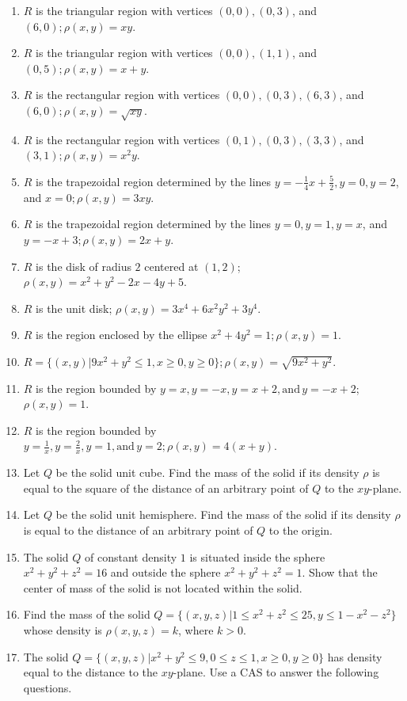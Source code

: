 \documentclass{exercises}
\begin{document}
\begin{enumerate}[resume]
\item $R$ is the triangular region with vertices $(0,0),(0,3)$, and $(6,0);\rho(x,y)=xy$.
\item $R$ is the triangular region with vertices $(0,0),(1,1)$, and $(0,5);\rho(x,y)=x+y$.
\item $R$ is the rectangular region with vertices $(0,0),(0,3),(6,3)$, and $(6,0);\rho(x,y)=\sqrt{xy}$.
\item $R$ is the rectangular region with vertices $(0,1),(0,3),(3,3)$, and $(3,1);\rho(x,y)=x^{2}y$.
\item $R$ is the trapezoidal region determined by the lines $y=-\frac{1}{4}x+\frac{5}{2},y=0,y=2$, and $x=0;\rho(x,y)=3xy$.
\item $R$ is the trapezoidal region determined by the lines $y=0,y=1,y=x$, and $y=-x+3;\rho(x,y)=2x+y$.
\item $R$ is the disk of radius $2$ centered at $(1,2)$; $\rho(x,y)=x^{2}+y^{2}-2x-4y+5$.
\item $R$ is the unit disk; $\rho(x,y)=3x^{4}+6x^{2}y^{2}+3y^{4}$.
\item $R$ is the region enclosed by the ellipse $x^{2}+4y^{2}=1;\rho(x,y)=1$.
\item $R=\{(x,y)|9x^{2}+y^{2}\le1,x\ge0,y\ge0\};\rho(x,y)=\sqrt{9x^{2}+y^{2}}$.
\item $R$ is the region bounded by $y=x,y=-x,y=x+2,\text{and}\,y=-x+2$; $\rho(x,y)=1$.
\item $R$ is the region bounded by $y=\frac{1}{x},y=\frac{2}{x},y=1,\text{and}\,y=2;\rho(x,y)=4(x+y)$.
\item Let $Q$ be the solid unit cube. Find the mass of the solid if its density $\rho$ is equal to the square of the distance of an arbitrary point of $Q$ to the $xy\text{-plane}$.
\item Let $Q$ be the solid unit hemisphere. Find the mass of the solid if its density $\rho$ is equal to the distance of an arbitrary point of $Q$ to the origin.
\item The solid $Q$ of constant density $1$ is situated inside the sphere $x^{2}+y^{2}+z^{2}=16$ and outside the sphere $x^{2}+y^{2}+z^{2}=1$. Show that the center of mass of the solid is not located within the solid.
\item Find the mass of the solid $Q=\{(x,y,z)|1\le x^{2}+z^{2}\le25,y\le1-x^{2}-z^{2}\}$ whose density is $\rho(x,y,z)=k$, where $k>0$.
\item \techrequired The solid $Q=\{(x,y,z)|x^{2}+y^{2}\le9,0\le z\le1,x\ge0,y\ge0\}$ has density equal to the distance to the $xy\text{-plane}$. Use a CAS to answer the following questions.

\end{enumerate}
\end{document}
